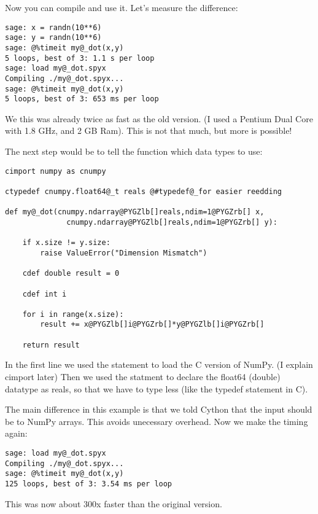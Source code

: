 \documentclass[letterpaper,10pt,english]{manual}
\begin{document}
Now you can compile and use it. Let's measure the difference:

\begin{Verbatim}[commandchars=@\[\]]
sage: x = randn(10**6)
sage: y = randn(10**6)
sage: @%timeit my@_dot(x,y)
5 loops, best of 3: 1.1 s per loop
sage: load my@_dot.spyx
Compiling ./my@_dot.spyx...
sage: @%timeit my@_dot(x,y)
5 loops, best of 3: 653 ms per loop
\end{Verbatim}

We this was already twice as fast as the old version.
(I used a Pentium Dual Core with 1.8
GHz, and 2 GB Ram). This is not that much, but more is possible!

The next step would be to tell the function which data types to use:

\begin{Verbatim}[commandchars=@\[\]]
cimport numpy as cnumpy

ctypedef cnumpy.float64@_t reals @#typedef@_for easier reedding

def my@_dot(cnumpy.ndarray@PYGZlb[]reals,ndim=1@PYGZrb[] x,
              cnumpy.ndarray@PYGZlb[]reals,ndim=1@PYGZrb[] y):

    if x.size != y.size:
        raise ValueError("Dimension Mismatch")

    cdef double result = 0

    cdef int i

    for i in range(x.size):
        result += x@PYGZlb[]i@PYGZrb[]*y@PYGZlb[]i@PYGZrb[]

    return result
\end{Verbatim}

In the first line we used the  statement to load the C version
of NumPy. (I explain cimport later)
Then we used the  statment to declare the float64 (double)
datatype as reals, so that we have to type less (like the typedef
statement in C).

The main difference in this example is that we told Cython that the
input should be to NumPy arrays. This avoids unecessary overhead. Now
we make the timing again:

\begin{Verbatim}[commandchars=@\[\]]
sage: load my@_dot.spyx
Compiling ./my@_dot.spyx...
sage: @%timeit my@_dot(x,y)
125 loops, best of 3: 3.54 ms per loop
\end{Verbatim}

This was now about 300x faster than the original version.
\end{document}
